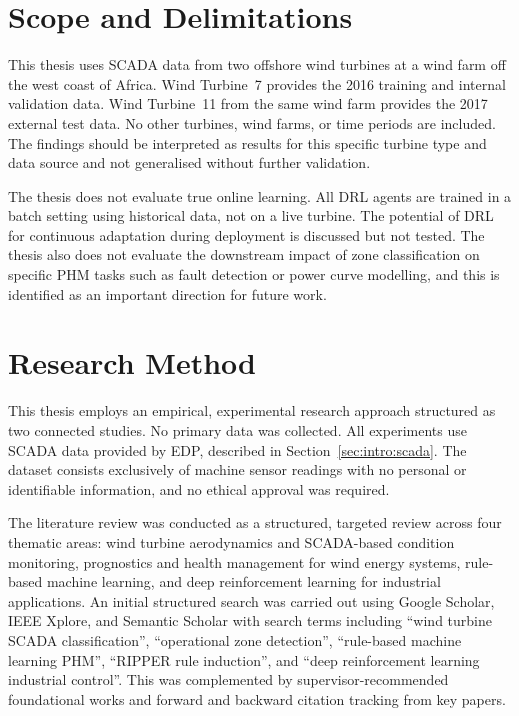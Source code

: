 \section{Scope and Delimitations}
\label{sec:intro:scope}

This thesis uses SCADA data from two offshore wind turbines at a wind farm off the west
coast of Africa. Wind Turbine~7 provides the 2016 training and internal validation data.
Wind Turbine~11 from the same wind farm provides the 2017 external test data. No other
turbines, wind farms, or time periods are included. The findings should be interpreted as
results for this specific turbine type and data source and not generalised without further
validation.

The thesis does not evaluate true online learning. All DRL agents are trained in a batch
setting using historical data, not on a live turbine. The potential of DRL for continuous
adaptation during deployment is discussed but not tested. The thesis also does not
evaluate the downstream impact of zone classification on specific PHM tasks such as fault
detection or power curve modelling, and this is identified as an important direction for
future work.

\section{Research Method}
\label{sec:intro:method}

This thesis employs an empirical, experimental research approach structured as two
connected studies. No primary data was collected. All experiments use SCADA data provided
by EDP, described in Section~\ref{sec:intro:scada}. The dataset consists exclusively of
machine sensor readings with no personal or identifiable information, and no ethical
approval was required.

The literature review was conducted as a structured, targeted review across four thematic
areas: wind turbine aerodynamics and SCADA-based condition monitoring, prognostics and
health management for wind energy systems, rule-based machine learning, and deep
reinforcement learning for industrial applications. An initial structured search was
carried out using Google Scholar, IEEE Xplore, and Semantic Scholar with search terms
including ``wind turbine SCADA classification'', ``operational zone detection'',
``rule-based machine learning PHM'', ``RIPPER rule induction'', and ``deep reinforcement
learning industrial control''. This was complemented by supervisor-recommended
foundational works and forward and backward citation tracking from key papers.

